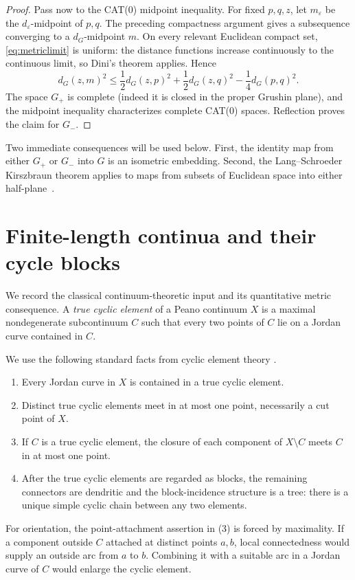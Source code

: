\documentclass[11pt]{article}
\begin{document}
\begin{proof}
Pass now to the CAT(0) midpoint inequality.  For fixed $p,q,z$, let
$m_\varepsilon$ be the $d_\varepsilon$-midpoint of $p,q$.  The preceding
compactness argument gives a subsequence converging to a $d_G$-midpoint $m$.
On every relevant Euclidean compact set, \eqref{eq:metriclimit} is uniform:
the distance functions increase continuously to the continuous limit, so
Dini's theorem applies.  Hence
\[
 d_G(z,m)^2\le
 \frac12d_G(z,p)^2+\frac12d_G(z,q)^2-\frac14d_G(p,q)^2.
\]
The space $G_+$ is complete (indeed it is closed in the proper Grushin
plane), and the midpoint inequality characterizes complete CAT(0) spaces.
Reflection proves the claim for $G_-$.
\end{proof}

Two immediate consequences will be used below.  First, the identity map from
either $G_+$ or $G_-$ into $G$ is an isometric embedding.  Second, the
Lang--Schroeder Kirszbraun theorem applies to maps from subsets of Euclidean
space into either half-plane~\cite{LangSchroeder}.

\section{Finite-length continua and their cycle blocks}

We record the classical continuum-theoretic input and its quantitative
metric consequence.  A \emph{true cyclic element} of a Peano continuum $X$
is a maximal nondegenerate subcontinuum $C$ such that every two points of $C$
lie on a Jordan curve contained in $C$.

We use the following standard facts from cyclic element theory
\cite[Chapter~IV]{Whyburn}.
\begin{enumerate}
\item Every Jordan curve in $X$ is contained in a true cyclic element.
\item Distinct true cyclic elements meet in at most one point, necessarily a
cut point of $X$.
\item If $C$ is a true cyclic element, the closure of each component of
$X\setminus C$ meets $C$ in at most one point.
\item After the true cyclic elements are regarded as blocks, the remaining
connectors are dendritic and the block-incidence structure is a tree: there
is a unique simple cyclic chain between any two elements.
\end{enumerate}
For orientation, the point-attachment assertion in (3) is forced by
maximality.  If a component outside $C$ attached at distinct points $a,b$,
local connectedness would supply an outside arc from $a$ to $b$.  Combining
it with a suitable arc in a Jordan curve of $C$ would enlarge the cyclic
element.
\end{document}
